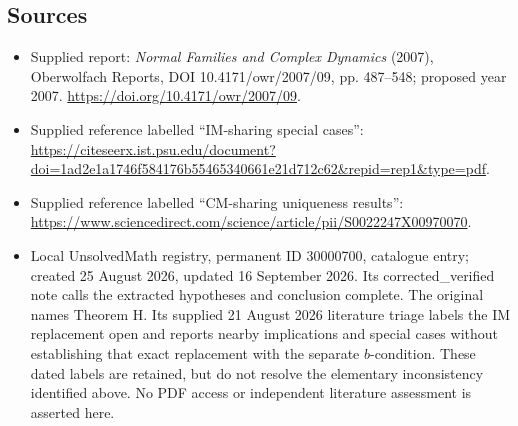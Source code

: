 \documentclass[11pt]{article}
\begin{document}
\subsection{Sources}
\begin{itemize}
\item Supplied report: \emph{Normal Families and Complex Dynamics} (2007), Oberwolfach Reports, DOI 10.4171/owr/2007/09, pp. 487--548; proposed year 2007. \url{https://doi.org/10.4171/owr/2007/09}.
\item Supplied reference labelled ``IM-sharing special cases'': \url{https://citeseerx.ist.psu.edu/document?doi=1ad2e1a1746f584176b55465340661e21d712c62&repid=rep1&type=pdf}.
\item Supplied reference labelled ``CM-sharing uniqueness results'': \url{https://www.sciencedirect.com/science/article/pii/S0022247X00970070}.
\item Local UnsolvedMath registry, permanent ID 30000700, catalogue entry; created 25 August 2026, updated 16 September 2026. Its corrected\_verified note calls the extracted hypotheses and conclusion complete. The original names Theorem H. Its supplied 21 August 2026 literature triage labels the IM replacement open and reports nearby implications and special cases without establishing that exact replacement with the separate $b$-condition. These dated labels are retained, but do not resolve the elementary inconsistency identified above. No PDF access or independent literature assessment is asserted here.
\end{itemize}
\end{document}
